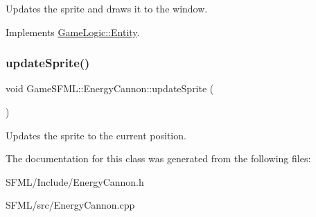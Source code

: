Updates the sprite and draws it to the window. 

Implements \hyperlink{classGameLogic_1_1Entity_adf23a7036cb99dfc6e33434018131da4}{Game\+Logic\+::\+Entity}.

\mbox{\label{classGameSFML_1_1EnergyCannon_a2d71ccd7276055f9b5f9e688545d5982}} 
\subsubsection{\texorpdfstring{update\+Sprite()}{updateSprite()}}
{\footnotesize\ttfamily void Game\+S\+F\+M\+L\+::\+Energy\+Cannon\+::update\+Sprite (\begin{DoxyParamCaption}{ }\end{DoxyParamCaption})}

Updates the sprite to the current position. 

The documentation for this class was generated from the following files\+:\begin{DoxyCompactItemize}
\item 
S\+F\+M\+L/\+Include/Energy\+Cannon.\+h\item 
S\+F\+M\+L/src/Energy\+Cannon.\+cpp\end{DoxyCompactItemize}
